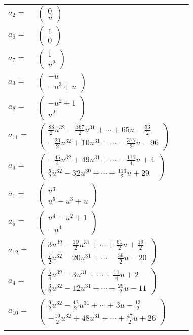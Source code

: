 \documentclass[1p]{elsarticle_modified}
\theoremstyle{definition}
\begin{document}
\begin{tabular}{m{7pt} m{180pt} m{7pt} m{180pt} }
\flushright $a_{2}=$&$\begin{pmatrix}0\\u\end{pmatrix}$ \\
\flushright $a_{6}=$&$\begin{pmatrix}1\\0\end{pmatrix}$ \\
\flushright $a_{7}=$&$\begin{pmatrix}1\\u^2\end{pmatrix}$ \\
\flushright $a_{3}=$&$\begin{pmatrix}- u\\- u^3+u\end{pmatrix}$ \\
\flushright $a_{8}=$&$\begin{pmatrix}- u^2+1\\u^2\end{pmatrix}$ \\
\flushright $a_{11}=$&$\begin{pmatrix}\frac{83}{2} u^{32}-\frac{367}{2} u^{31}+\cdots+65 u-\frac{53}{2}\\-\frac{23}{2} u^{32}+10 u^{31}+\cdots-\frac{375}{2} u-96\end{pmatrix}$ \\
\flushright $a_{9}=$&$\begin{pmatrix}-\frac{45}{4} u^{32}+49 u^{31}+\cdots-\frac{115}{4} u+4\\\frac{5}{2} u^{32}-32 u^{30}+\cdots+\frac{113}{2} u+29\end{pmatrix}$ \\
\flushright $a_{1}=$&$\begin{pmatrix}u^3\\u^5- u^3+u\end{pmatrix}$ \\
\flushright $a_{5}=$&$\begin{pmatrix}u^4- u^2+1\\- u^4\end{pmatrix}$ \\
\flushright $a_{12}=$&$\begin{pmatrix}3 u^{32}-\frac{19}{2} u^{31}+\cdots+\frac{61}{2} u+\frac{19}{2}\\\frac{7}{2} u^{32}-20 u^{31}+\cdots-\frac{59}{2} u-20\end{pmatrix}$ \\
\flushright $a_{4}=$&$\begin{pmatrix}\frac{5}{4} u^{32}-3 u^{31}+\cdots+\frac{11}{4} u+2\\\frac{3}{2} u^{32}-12 u^{31}+\cdots-\frac{29}{2} u-11\end{pmatrix}$ \\
\flushright $a_{10}=$&$\begin{pmatrix}\frac{9}{2} u^{32}-\frac{43}{2} u^{31}+\cdots+3 u-\frac{13}{2}\\-\frac{19}{2} u^{32}+48 u^{31}+\cdots+\frac{47}{2} u+26\end{pmatrix}$\\&\end{tabular}
\end{document}
